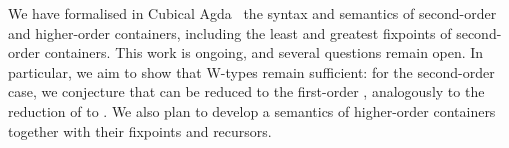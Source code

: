 \documentclass{article}
\begin{document}
We have formalised in Cubical Agda~\cite{cubicalagda} the syntax and semantics of second-order and higher-order containers, including the least and greatest fixpoints of second-order containers. This work is ongoing, and several questions remain open. In particular, we aim to show that W-types remain sufficient: for the second-order case, we conjecture that  can be reduced to the first-order , analogously to the reduction of  to . We also plan to develop a semantics of higher-order containers together with their fixpoints and recursors.










\end{document}
